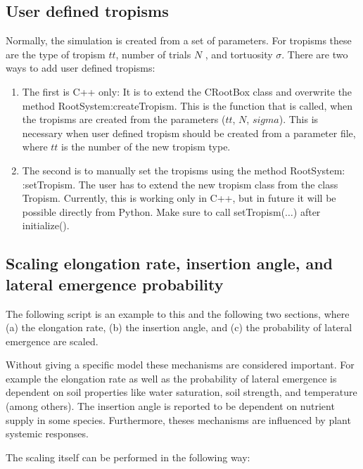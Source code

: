 \documentclass[a4paper]{article}
\begin{document}
\subsection{User defined tropisms} \label{sec:usertropism}

Normally, the simulation is created from a set of parameters. For tropisms these are the type of tropism $tt$, number of trials $N$ , and tortuosity $\sigma$.
There are two ways to add user defined tropisms: 

\begin{enumerate}
\item The first is C++ only: It is to extend the CRootBox class and overwrite the method RootSystem:createTropism. 
This is the function that is called, when the tropisms are created from the parameters ($tt$, $N$, $sigma$). This is necessary when user defined tropism should be created from a parameter file, where $tt$ is the number of the new tropism type. 
\item The second is to manually set the tropisms using the method RootSystem: :setTropism. 
The user has to extend the new tropism class from the class Tropism. 
Currently, this is working only in C++, but in future it will be possible directly from Python. Make sure to call setTropism($\dots$) after initialize().
\end{enumerate}


\subsection{Scaling elongation rate, insertion angle, and lateral emergence probability} \label{sec:elongation}

The following script is an example to this and the following two sections, where (a) the elongation rate, (b) the insertion angle, and (c) the probability of lateral emergence are scaled.

Without giving a specific model these mechanisms are considered important. 
For example the elongation rate as well as the probability of lateral emergence is dependent on soil properties like water saturation, soil strength, and temperature (among others).  
The insertion angle is reported to be dependent on nutrient supply in some species. Furthermore, theses mechanisms are influenced by plant systemic responses.

The scaling itself can be performed in the following way:


\end{document}
